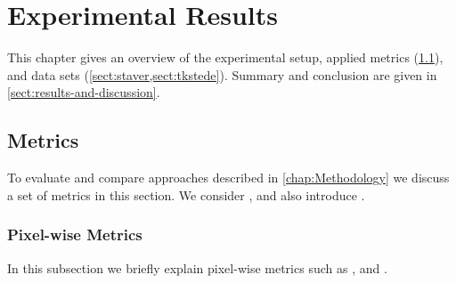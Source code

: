 \chapter{Experimental Results}
This chapter gives an overview of the experimental setup, applied metrics
(\cref{sect:metrics}), and data sets (\cref{sect:staver,sect:tkstede}). Summary
and conclusion are given in \cref{sect:results-and-discussion}.

\section{Metrics}\label{sect:metrics}
To evaluate and compare approaches described in \cref{chap:Methodology} we
discuss a set of metrics in this section. We consider
,  and also
introduce .

\subsection{Pixel-wise Metrics}\label{subsect:pixel-wise-metrics}
In this subsection we briefly explain pixel-wise metrics such as
,  and .

